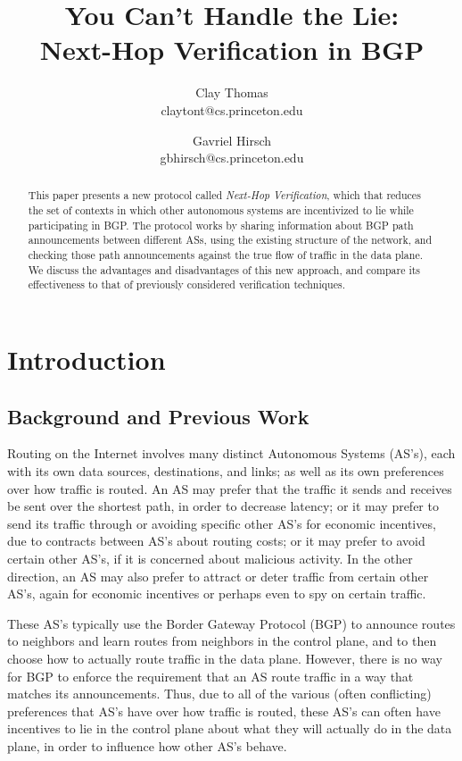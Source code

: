 \documentclass[10pt]{article}
\begin{document}

\title{
  You Can't Handle the Lie: \\
  Next-Hop Verification in BGP
}
\author{
  Clay Thomas\\ claytont@cs.princeton.edu
  \and 
  Gavriel Hirsch\\ gbhirsch@cs.princeton.edu 
}
\maketitle

\begin{abstract}
  This paper presents a new protocol called \emph{Next-Hop Verification},
  which that reduces the set of contexts in which
  other autonomous systems are incentivized to lie while participating in BGP.
  The protocol works by sharing information about BGP path announcements
  between different ASs, using the existing structure of the network,
  and checking those path announcements against the true flow of traffic
  in the data plane.
  We discuss the advantages and disadvantages of this new approach,
  and compare its effectiveness to that of previously considered verification
  techniques.
\end{abstract}


\section{Introduction}

  \subsection{Background and Previous Work}
    Routing on the Internet involves many distinct Autonomous Systems (AS's), each
    with its own data sources, destinations, and links; as well as its own
    preferences over how traffic is routed. An AS may prefer that the traffic it
    sends and receives be sent over the shortest path, in order to decrease
    latency; or it may prefer to send its traffic through or avoiding specific
    other AS's for economic incentives, due to contracts between AS's about
    routing costs; or it may prefer to avoid certain other AS's, if it is
    concerned about malicious activity. In the other direction, an AS may also
    prefer to attract or deter traffic from certain other AS's, again for economic
    incentives or perhaps even to spy on certain traffic.

    These AS's typically use the Border Gateway Protocol (BGP) to announce
    routes to neighbors and learn routes from neighbors in the control plane,
    and to then choose how to actually route traffic in the data plane. However,
    there is no way for BGP to enforce the requirement that an AS route traffic in a
    way that matches its announcements.
    Thus, due to all of the various (often conflicting)
    preferences that AS's have over how traffic is routed, these
    AS's can often have incentives to lie in the control plane about what they
    will actually do in the data plane, in order to influence how other AS's behave.
\end{document}
